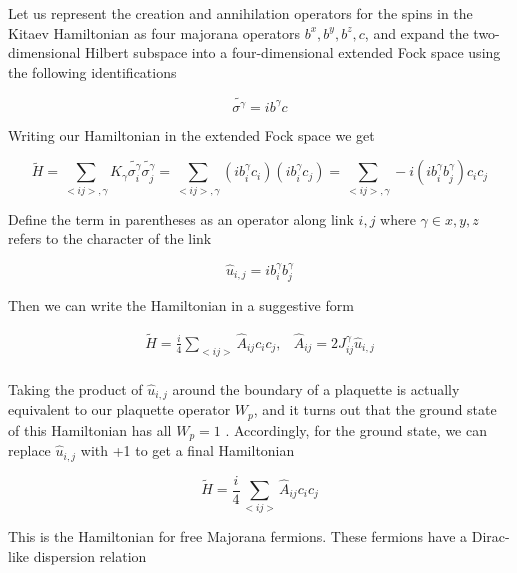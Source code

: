 Let us represent the creation and annihilation operators for the spins in the Kitaev Hamiltonian as four majorana operators $b^{x}, b^{y}, b^{z}, c$, and expand the two-dimensional Hilbert subspace into a four-dimensional extended Fock space using the following identifications

\begin{equation}
\widetilde{\sigma^{\gamma}} = i b^{\gamma} c
\end{equation}

Writing our Hamiltonian in the extended Fock space we get

\begin{equation}
\widetilde{H} = \sum_{<ij>,\gamma} K_{\gamma} \widetilde{\sigma^{\gamma}_{i}}\widetilde{\sigma^{\gamma}_{j}} = \sum_{<ij>,\gamma} (i b^{\gamma}_{i}c_{i}) (i b^{\gamma}_{i}c_{j}) = \sum_{<ij>,\gamma} -i(ib^{\gamma}_{i}b^{\gamma}_{j})c_{i}c_{j}
\end{equation}

Define the term in parentheses as an operator along link $i,j$ where $\gamma \in x,y,z$ refers to the character of the link

\begin{equation}
\hat{u}_{i,j} = i b_{i}^{\gamma} b_{j}^{\gamma}
\end{equation}

Then we can write the Hamiltonian in a suggestive form

\begin{equation}
\begin{array}{cc}
	\tilde{H} = \frac{i}{4} \sum_{<ij>} \hat{A}_{ij} c_{i} c_{j}, & \hat{A}_{ij} = 2 J^{\gamma}_{ij}\hat{u}_{i,j} \\
\end{array}
\end{equation}

Taking the product of $\hat{u}_{i,j}$ around the boundary of a plaquette is actually equivalent to our plaquette operator $W_{p}$, and it turns out that the ground state of this Hamiltonian has all $W_{p} = 1$ \cite{Lieb1994}. Accordingly, for the ground state, we can replace $\hat{u}_{i,j}$ with +1 to get a final Hamiltonian

\begin{equation}
\tilde{H} = \frac{i}{4} \sum_{<ij>} \hat{A}_{ij} c_{i} c_{j}
\end{equation}

This is the Hamiltonian for free Majorana fermions. These fermions have a Dirac-like dispersion relation

